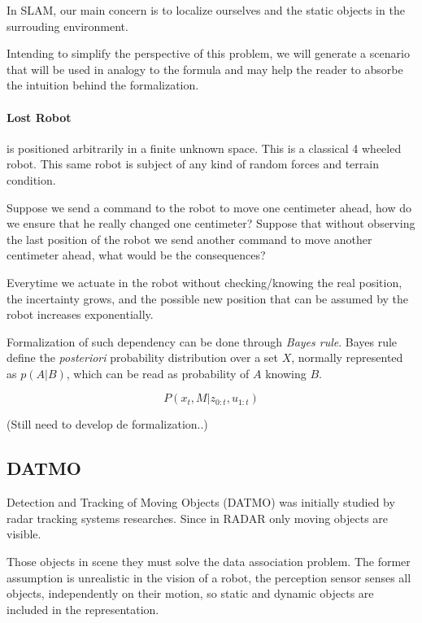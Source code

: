 In SLAM, our main concern is to localize ourselves and the static objects in the surrouding environment. 

Intending to simplify the perspective of this problem, we will generate a scenario that will be used in analogy to the formula and may help the reader to absorbe the intuition behind the formalization.

\paragraph*{Lost Robot} is positioned arbitrarily in a finite unknown space. This is a classical 4 wheeled robot. This same robot is subject of any kind of random forces and terrain condition. 

Suppose we send a command to the robot to move one centimeter ahead, how do we ensure that he really changed one centimeter? Suppose that without observing the last position of the robot we send another command to move another centimeter ahead, what would be the consequences? 

Everytime we actuate in the robot without checking/knowing the real position, the incertainty grows, and the possible new position that can be assumed by the robot increases exponentially.

Formalization of such dependency can be done through \textit{Bayes rule}. Bayes rule define the \textit{posteriori} probability distribution over a set $X$, normally represented as $p(A | B)$, which can be read as probability of $A$ knowing $B$.

\begin{equation}
\label{jpd:discrete}
P(x_t,M | z_{0:t}, u_{1:t})
\end{equation}

(Still need to develop de formalization..)

\subsection{DATMO}

Detection and Tracking of Moving Objects (DATMO) was initially studied by radar tracking systems \cite{VU-2009-454238} researches. Since in RADAR only moving objects are visible.

Those objects in scene they must solve the data association problem. The former assumption is unrealistic in the vision of a robot, the perception sensor senses all objects, independently on their motion, so static and dynamic objects are included in the representation.

